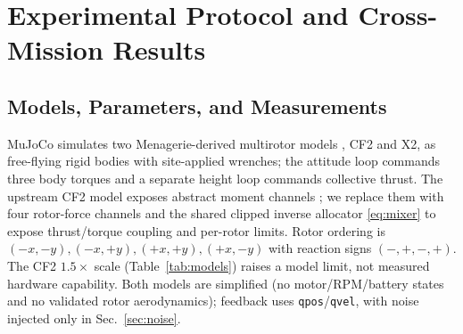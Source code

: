 \documentclass[letterpaper, 10 pt, conference]{ieeeconf}
\begin{document}
\section{Experimental Protocol and Cross-Mission Results}
\label{sec:results}
\subsection{Models, Parameters, and Measurements}

MuJoCo \cite{todorov2012mujoco} simulates two Menagerie-derived multirotor models \cite{menagerieModels}, CF2 and X2, as free-flying rigid bodies with site-applied wrenches; the attitude loop commands three body torques and a separate height loop commands collective thrust.
The upstream CF2 model exposes abstract moment channels \cite{menagerieCF2}; we replace them with four rotor-force channels and the shared clipped inverse allocator \eqref{eq:mixer} to expose thrust/torque coupling and per-rotor limits. Rotor ordering is $(-x,-y),(-x,+y),(+x,+y),(+x,-y)$ with reaction signs $(-,+,-,+)$. The CF2 $1.5\times$ scale (Table~\ref{tab:models}) raises a model limit, not measured hardware capability. Both models are simplified (no motor/RPM/battery states and no validated rotor aerodynamics); feedback uses \texttt{qpos}/\texttt{qvel}, with noise injected only in Sec.~\ref{sec:noise}.
\end{document}
